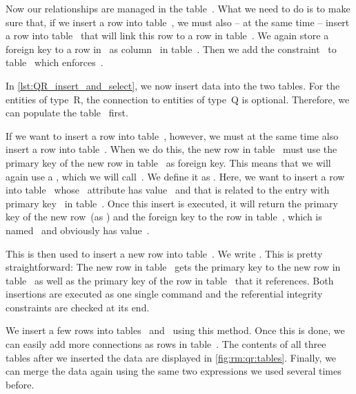 Now our relationships are managed in the table~.
What we need to do is to make sure that, if we insert a row into table~, we must also -- at the same time -- insert a row into table~ that will link this row to a row in table~.
We again store a  foreign key to a row in~ as column~ in table~.
Then we add the constraint~ to table~ which enforces~.

In \cref{lst:QR_insert_and_select}, we now insert data into the two tables.
For the entities of type~R, the connection to entities of type~Q is optional.
Therefore, we can populate the table~ first.

If we want to insert a row into table~, however, we must at the same time also insert a row into table~.
When we do this, the new row in table~ must use the primary key of the new row in table~ as foreign key.
This means that we will again use a , which we will call~.
We define it as .
Here, we want to insert a row into table~ whose ~attribute has value~ and that is related to the entry with primary key~ in table~.
Once this insert is executed, it will return the primary key of the new row~(as ) and the foreign key to the row in table~, which is named~ and obviously has value~.%
%
\begin{sloppypar}%
This  is then used to insert a new row into table~.
We write .
This is pretty straightforward:
The new row in table~ gets the primary key to the new row in table~ as well as the primary key of the row in table~ that it references.
Both insertions are executed as one single command and the referential integrity constraints are checked at its end.%
\end{sloppypar}%
%
We insert a few rows into tables~ and~ using this method.
Once this is done, we can easily add more connections as rows in table~.
The contents of all three tables after we inserted the data are displayed in \cref{fig:rm:qr:tables}.
Finally, we can merge the data again using the same two  expressions we used several times before.

